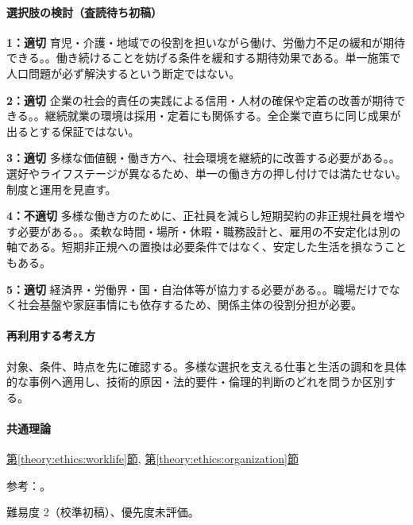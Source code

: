 \paragraph{選択肢の検討（査読待ち初稿）}\mbox{}\par

\noindent\textbf{1：適切} 育児・介護・地域での役割を担いながら働け、労働力不足の緩和が期待できる。。働き続けることを妨げる条件を緩和する期待効果である。単一施策で人口問題が必ず解決するという断定ではない。\par

\noindent\textbf{2：適切} 企業の社会的責任の実践による信用・人材の確保や定着の改善が期待できる。。継続就業の環境は採用・定着にも関係する。全企業で直ちに同じ成果が出るとする保証ではない。\par

\noindent\textbf{3：適切} 多様な価値観・働き方へ、社会環境を継続的に改善する必要がある。。選好やライフステージが異なるため、単一の働き方の押し付けでは満たせない。制度と運用を見直す。\par

\noindent\textbf{4：不適切} 多様な働き方のために、正社員を減らし短期契約の非正規社員を増やす必要がある。。柔軟な時間・場所・休暇・職務設計と、雇用の不安定化は別の軸である。短期非正規への置換は必要条件ではなく、安定した生活を損なうこともある。\par

\noindent\textbf{5：適切} 経済界・労働界・国・自治体等が協力する必要がある。。職場だけでなく社会基盤や家庭事情にも依存するため、関係主体の役割分担が必要。\par

\paragraph{再利用する考え方} 対象、条件、時点を先に確認する。多様な選択を支える仕事と生活の調和を具体的な事例へ適用し、技術的原因・法的要件・倫理的判断のどれを問うか区別する。

\paragraph{共通理論} \hyperref[theory:ethics:worklife]{第\ref*{theory:ethics:worklife}節}, \hyperref[theory:ethics:organization]{第\ref*{theory:ethics:organization}節}

\par 参考：\cite{cabinet_worklife}。

\par 難易度 2（校準初稿）、優先度未評価。
